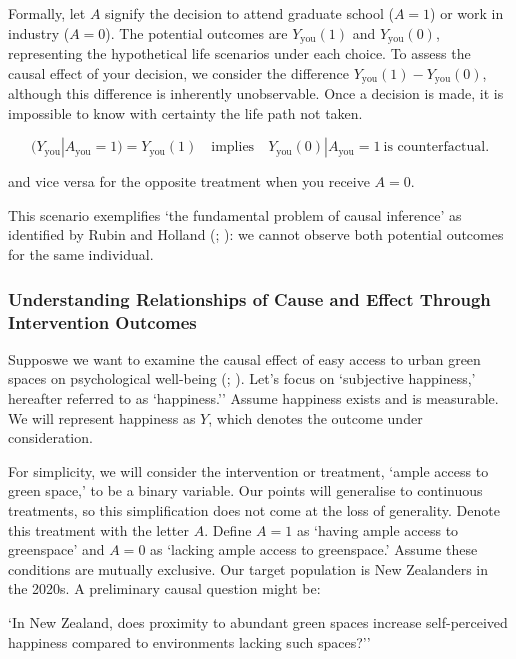 \documentclass[
  singlecolumn]{article}
\begin{document}
Formally, let \(A\) signify the decision to attend graduate school
(\(A = 1\)) or work in industry (\(A = 0\)). The potential outcomes are
\(Y_{\text{you}}(1)\) and \(Y_{\text{you}}(0)\), representing the
hypothetical life scenarios under each choice. To assess the causal
effect of your decision, we consider the difference
\(Y_{\text{you}}(1) - Y_{\text{you}}(0)\), although this difference is
inherently unobservable. Once a decision is made, it is impossible to
know with certainty the life path not taken.

\[
(Y_{\text{you}}|A_{\text{you}} = 1) = Y_{\text{you}}(1) \quad \text{implies} \quad Y_{\text{you}}(0)|A_{\text{you}} = 1~ \text{is counterfactual}.
\]

and vice versa for the opposite treatment when you receive \(A = 0\).

This scenario exemplifies `the fundamental problem of causal inference'
as identified by Rubin and Holland (; ): we cannot observe both
potential outcomes for the same individual.

\subsubsection{Understanding Relationships of Cause and Effect Through
Intervention
Outcomes}\label{understanding-relationships-of-cause-and-effect-through-intervention-outcomes}

Supposwe we want to examine the causal effect of easy access to urban
green spaces on psychological well-being
(;
).
Let's focus on `subjective happiness,' hereafter referred to as
`happiness.'' Assume happiness exists and is measurable. We will
represent happiness as \(Y\), which denotes the outcome under
consideration.

For simplicity, we will consider the intervention or treatment, `ample
access to green space,' to be a binary variable. Our points will
generalise to continuous treatments, so this simplification does not
come at the loss of generality. Denote this treatment with the letter
\(A\). Define \(A = 1\) as `having ample access to greenspace' and
\(A = 0\) as `lacking ample access to greenspace.' Assume these
conditions are mutually exclusive. Our target population is New
Zealanders in the 2020s. A preliminary causal question might be:

`In New Zealand, does proximity to abundant green spaces increase
self-perceived happiness compared to environments lacking such spaces?''
\end{document}

